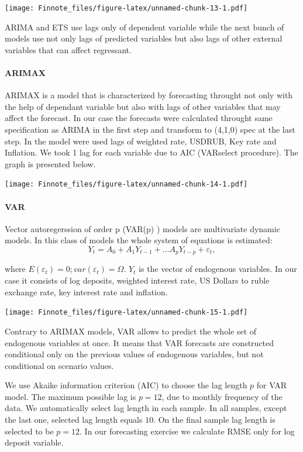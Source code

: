 \documentclass[
]{article}
\begin{document}
\texttt{[image: Finnote\_files/figure-latex/unnamed-chunk-13-1.pdf]}

ARIMA and ETS use lags only of dependent variable while the next bunch
of models use not only lags of predicted variables but also lags of
other external variables that can affect regressant.

\hypertarget{arimax}{%
\paragraph{ARIMAX}\label{arimax}}

ARIMAX is a model that is characterized by forecasting throught not only
with the help of dependant variable but also with lags of other
variables that may affect the forecast. In our case the forecasts were
calculated throught same specification as ARIMA in the first step and
transform to (4,1,0) spec at the last step. In the model were used lags
of weighted rate, USDRUB, Key rate and Inflation. We took 1 lag for each
variable due to AIC (VARselect procedure). The graph is presented below.

\texttt{[image: Finnote\_files/figure-latex/unnamed-chunk-14-1.pdf]}

\hypertarget{var}{%
\paragraph{VAR}\label{var}}

Vector autoregerssion of order p (VAR(p) ) models are multivariate
dynamic models. In this class of models the whole system of equations is
estimated:
\[Y_t = A_0 + A_1 Y_{t-1} + \ldots A_p Y_{t-p} + \varepsilon_t,\]

where \(E(\varepsilon_t)=0; var(\varepsilon_t) = \Omega\). \(Y_t\) is
the vector of endogenous variables. In our case it consists of log
deposits, weighted interest rate, US Dollars to ruble exchange rate, key
interest rate and inflation.

\texttt{[image: Finnote\_files/figure-latex/unnamed-chunk-15-1.pdf]}

Contrary to ARIMAX models, VAR allows to predict the whole set of
endogenous variables at once. It means that VAR forecasts are
constructed conditional only on the previous values of endogenous
variables, but not conditional on scenario values.

We use Akaike information criterion (AIC) to choose the lag length \(p\)
for VAR model. The maximum possible lag is \(p=12\), due to monthly
frequency of the data. We automatically select lag length in each
sample. In all samples, except the last one, selected lag length equals
\(10\). On the final sample lag length is selected to be \(p=12\). In
our forecasting exercise we calculate RMSE only for log deposit
variable.
\end{document}
